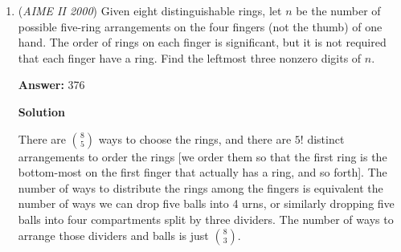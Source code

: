 \begin{enumerate}
Somewhat similar to the first solution, we see that the number $n$ has two even factors for every odd factor.  Thus, if $x$ is an odd factor of $n$, then $2x$ and $4x$ must be the two corresponding even factors.  So, the prime factorization of $n$ is $2^2 3^a 5^b 7^c...$ for some set of integers $a, b, c, ...$

 Since there are $18$ factors of $n$, we can write:

 $(2+1)(a+1)(b+1)(c+1)... = 18$
$(a+1)(b+1)(c+1)... = 6$

 Since $6$ only has factors from the set $1, 2, 3, 6$, either $a=5$ and all other variables are $0$, or $a=3$ and $b=2$, with again all other variables equal to $0$.  This gives the two numbers $2^2 \cdot 3^5$ and $2^2 \cdot 3^2 \cdot 5$.  The latter number is smaller, and is equal to $\boxed {180}$.

 



\textbf{Solution 3}

We see that the least number with 6 odd factors is $3^2*5$. Multiplied by $2^2$ (as each factor of 2 doubles the odd factors, as it can be 2n or $2^2n$. Finally, you get $180$

 -dragoon

 



\textbf{Solution 4}

As we are looking for the smallest number. We find the number of odd factors to be $3^{2}$ times $5$. We know that for there to be $12$ even factors, we can simply see that there will be 2 choices for the exponent of the $3$ and $5$, which means we need $3$ choices for the exponent of $2$ so the answer is $2^2$ times $3^2$ times $5$, which is $/boxed{180}$ .~jamespudi

 


	\item (\textit{AIME II 2000}) Given eight distinguishable rings, let $n$ be the number of possible five-ring arrangements on the four fingers (not the thumb) of one hand. The order of rings on each finger is significant, but it is not required that each finger have a ring. Find the leftmost three nonzero digits of $n$.


 
 \textbf{Answer: }376



\textbf{Solution}

There are $\binom{8}{5}$ ways to choose the rings, and there are $5!$ distinct arrangements to order the rings [we order them so that the first ring is the bottom-most on the first finger that actually has a ring, and so forth]. The number of ways to distribute the rings among the fingers is equivalent the number of ways we can drop five balls into 4 urns, or similarly dropping five balls into four compartments split by three dividers. The number of ways to arrange those dividers and balls is just $\binom {8}{3}$.


\end{enumerate}
